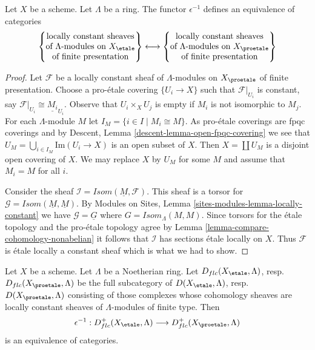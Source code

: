 \begin{lemma}
\label{lemma-compare-locally-constant}
Let $X$ be a scheme. Let $\Lambda$ be a ring.
The functor $\epsilon^{-1}$ defines an equivalence of categories
$$
\left\{
\begin{matrix}
\text{locally constant sheaves}\\
\text{of }\Lambda\text{-modules on }X_\etale\\
\text{of finite presentation}
\end{matrix}
\right\}
\longleftrightarrow
\left\{
\begin{matrix}
\text{locally constant sheaves}\\
\text{of }\Lambda\text{-modules on }X_\proetale\\
\text{of finite presentation}
\end{matrix}
\right\}
$$
\end{lemma}

\begin{proof}
Let $\mathcal{F}$ be a locally constant sheaf of $\Lambda$-modules
on $X_\proetale$ of finite presentation. Choose a pro-\'etale covering
$\{U_i \to X\}$ such that $\mathcal{F}|_{U_i}$ is constant, say
$\mathcal{F}|_{U_i} \cong \underline{M_i}_{U_i}$.
Observe that $U_i \times_X U_j$ is empty if $M_i$ is not isomorphic
to $M_j$.
For each $\Lambda$-module $M$ let $I_M = \{i \in I \mid M_i \cong M\}$.
As pro-\'etale coverings are fpqc coverings and by
Descent, Lemma \ref{descent-lemma-open-fpqc-covering}
we see that $U_M = \bigcup_{i \in I_M} \text{Im}(U_i \to X)$
is an open subset of $X$. Then $X = \coprod U_M$ is a disjoint
open covering of $X$. We may replace $X$ by $U_M$ for some $M$ and
assume that $M_i = M$ for all $i$.

\medskip\noindent
Consider the sheaf $\mathcal{I} = \mathit{Isom}(\underline{M}, \mathcal{F})$.
This sheaf is a torsor for
$\mathcal{G} = \mathit{Isom}(\underline{M}, \underline{M})$.
By Modules on Sites, Lemma \ref{sites-modules-lemma-locally-constant}
we have $\mathcal{G} = \underline{G}$
where $G = \mathit{Isom}_\Lambda(M, M)$.
Since torsors for the \'etale topology
and the pro-\'etale topology agree by
Lemma \ref{lemma-compare-cohomology-nonabelian}
it follows that $\mathcal{I}$ has sections \'etale locally on $X$.
Thus $\mathcal{F}$ is \'etale locally a constant sheaf which is
what we had to show.
\end{proof}

\begin{lemma}
\label{lemma-compare-locally-constant-derived}
Let $X$ be a scheme. Let $\Lambda$ be a Noetherian ring.
Let $D_{flc}(X_\etale, \Lambda)$, resp.\ $D_{flc}(X_\proetale, \Lambda)$
be the full subcategory of
$D(X_\etale, \Lambda)$, resp.\ $D(X_\proetale, \Lambda)$
consisting of those complexes whose cohomology sheaves are locally
constant sheaves of $\Lambda$-modules of finite type. Then
$$
\epsilon^{-1} :
D_{flc}^+(X_\etale, \Lambda)
\longrightarrow
D_{flc}^+(X_\proetale, \Lambda)
$$
is an equivalence of categories.
\end{lemma}

